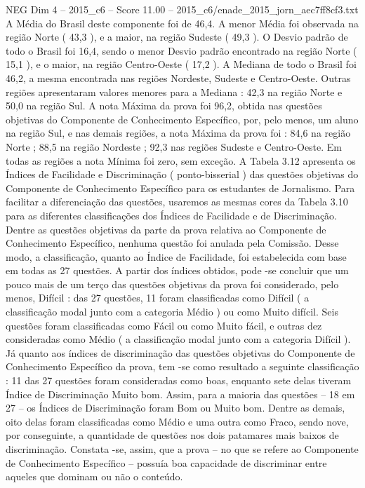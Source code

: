 \begin{textsample}{NEG Dim 4 – 2015\_c6 – Score 11.00 – 2015\_c6/enade\_2015\_jorn\_aec7ff8cf3.txt}
A Média do Brasil deste componente foi de 46,4.
A menor Média foi observada na região Norte ( 43,3 ), e a maior, na região Sudeste ( 49,3 ).
O Desvio padrão de todo o Brasil foi 16,4, sendo o menor Desvio padrão encontrado na região Norte ( 15,1 ), e o maior, na região Centro-Oeste ( 17,2 ).
A Mediana de todo o Brasil foi 46,2, a mesma encontrada nas regiões Nordeste, Sudeste e Centro-Oeste.
Outras regiões apresentaram valores menores para a Mediana : 42,3 na região Norte e 50,0 na região Sul.
A nota Máxima da prova foi 96,2, obtida nas questões objetivas do Componente de Conhecimento Específico, por, pelo menos, um aluno na região Sul, e nas demais regiões, a nota Máxima da prova foi : 84,6 na região Norte ; 88,5 na região Nordeste ; 92,3 nas regiões Sudeste e Centro-Oeste.
Em todas as regiões a nota Mínima foi zero, sem exceção.
A Tabela 3.12 apresenta os Índices de Facilidade e Discriminação ( ponto-bisserial ) das questões objetivas do Componente de Conhecimento Específico para os estudantes de Jornalismo.
Para facilitar a diferenciação das questões, usaremos as mesmas cores da Tabela 3.10 para as diferentes classificações dos Índices de Facilidade e de Discriminação.
Dentre as questões objetivas da parte da prova relativa ao Componente de Conhecimento Específico, nenhuma questão foi anulada pela Comissão.
Desse modo, a classificação, quanto ao Índice de Facilidade, foi estabelecida com base em todas as 27 questões.
A partir dos índices obtidos, pode -se concluir que um pouco mais de um terço das questões objetivas da prova foi considerado, pelo menos, Difícil : das 27 questões, 11 foram classificadas como Difícil ( a classificação modal junto com a categoria Médio ) ou como Muito difícil.
Seis questões foram classificadas como Fácil ou como Muito fácil, e outras dez consideradas como Médio ( a classificação modal junto com a categoria Difícil ).
Já quanto aos índices de discriminação das questões objetivas do Componente de Conhecimento Específico da prova, tem -se como resultado a seguinte classificação : 11 das 27 questões foram consideradas como boas, enquanto sete delas tiveram Índice de Discriminação Muito bom.
Assim, para a maioria das questões – 18 em 27 – os Índices de Discriminação foram Bom ou Muito bom.
Dentre as demais, oito delas foram classificadas como Médio e uma outra como Fraco, sendo nove, por conseguinte, a quantidade de questões nos dois patamares mais baixos de discriminação.
Constata -se, assim, que a prova – no que se refere ao Componente de Conhecimento Específico – possuía boa capacidade de discriminar entre aqueles que dominam ou não o conteúdo.

\end{textsample}
